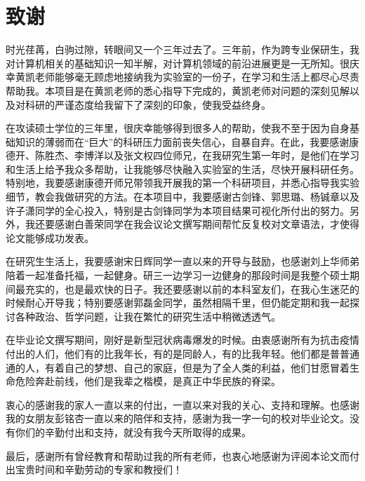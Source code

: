

\chapter*{致\quad 谢}
时光荏苒，白驹过隙，转眼间又一个三年过去了。三年前，作为跨专业保研生，我对计算机相关的基础知识一知半解，对计算机领域的前沿进展更是一无所知。很庆幸黄凯老师能够毫无顾虑地接纳我为实验室的一份子，在学习和生活上都尽心尽责帮助我。本项目是在黄凯老师的悉心指导下完成的，黄凯老师对问题的深刻见解以及对科研的严谨态度给我留下了深刻的印象，使我受益终身。

在攻读硕士学位的三年里，很庆幸能够得到很多人的帮助，使我不至于因为自身基础知识的薄弱而在“巨大”的科研压力面前丧失信心，自暴自弃。在此，我要感谢康德开、陈胜杰、李博洋以及张文权四位师兄，在我研究生第一年时，是他们在学习和生活上给予我众多帮助，让我能够尽快融入实验室的生活，尽快开展科研任务。特别地，我要感谢康德开师兄带领我开展我的第一个科研项目，并悉心指导我实验细节，教会我做研究的方法。在本项目中，我要感谢古剑锋、郭思璐、杨铖章以及许子潇同学的全心投入，特别是古剑锋同学为本项目结果可视化所付出的努力。另外，我还要感谢白善荣同学在我会议论文撰写期间帮忙反复校对文章语法，才使得论文能够成功发表。

在研究生生活上，我要感谢宋日辉同学一直以来的开导与鼓励，也感谢刘上华师弟陪着一起准备托福，一起健身。研三一边学习一边健身的那段时间是我整个硕士期间最充实的，也是最欢快的日子。我还要感谢以前的本科室友们，在我心生迷茫的时候耐心开导我；特别要感谢郭磊金同学，虽然相隔千里，但仍能定期和我一起探讨各种政治、哲学问题，让我在繁忙的研究生活中稍微透透气。%

在毕业论文撰写期间，刚好是新型冠状病毒爆发的时候。由衷感谢所有为抗击疫情付出的人们，他们有的比我年长，有的是同龄人，有的比我年轻。他们都是普普通通的人，有着自己的梦想、自己的家庭，但是为了全人类的利益，他们甘愿冒着生命危险奔赴前线，他们是我辈之楷模，是真正中华民族的脊梁。

衷心的感谢我的家人一直以来的付出，一直以来对我的关心、支持和理解。也感谢我的女朋友彭铭杏一直以来的陪伴和支持，感谢为我一字一句的校对毕业论文。没有你们的辛勤付出和支持，就没有我今天所取得的成果。

最后，感谢所有曾经教育和帮助过我的所有老师，也衷心地感谢为评阅本论文而付出宝贵时间和辛勤劳动的专家和教授们！

\maketime

